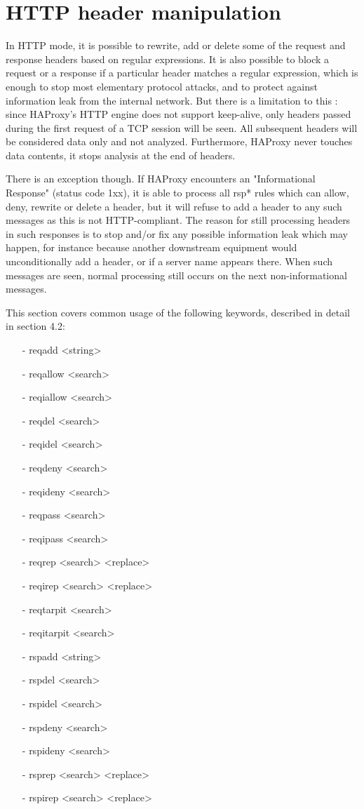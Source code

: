 \chapter{HTTP header manipulation}

In HTTP mode, it is possible to rewrite, add or delete some of the request and
response headers based on regular expressions. It is also possible to block a
request or a response if a particular header matches a regular expression,
which is enough to stop most elementary protocol attacks, and to protect
against information leak from the internal network. But there is a limitation
to this : since HAProxy's HTTP engine does not support keep-alive, only headers
passed during the first request of a TCP session will be seen. All subsequent
headers will be considered data only and not analyzed. Furthermore, HAProxy
never touches data contents, it stops analysis at the end of headers.

There is an exception though. If HAProxy encounters an "Informational Response"
(status code 1xx), it is able to process all rsp* rules which can allow, deny,
rewrite or delete a header, but it will refuse to add a header to any such
messages as this is not HTTP-compliant. The reason for still processing headers
in such responses is to stop and/or fix any possible information leak which may
happen, for instance because another downstream equipment would unconditionally
add a header, or if a server name appears there. When such messages are seen,
normal processing still occurs on the next non-informational messages.

This section covers common usage of the following keywords, described in detail
in section 4.2:
\begin{itemize}
\item[-] reqadd     <string>
\item[-] reqallow   <search>
\item[-] reqiallow  <search>
\item[-] reqdel     <search>
\item[-] reqidel    <search>
\item[-] reqdeny    <search>
\item[-] reqideny   <search>
\item[-] reqpass    <search>
\item[-] reqipass   <search>
\item[-] reqrep     <search> <replace>
\item[-] reqirep    <search> <replace>
\item[-] reqtarpit  <search>
\item[-] reqitarpit <search>
\item[-] rspadd     <string>
\item[-] rspdel     <search>
\item[-] rspidel    <search>
\item[-] rspdeny    <search>
\item[-] rspideny   <search>
\item[-] rsprep     <search> <replace>
\item[-] rspirep    <search> <replace>
\end{itemize}

